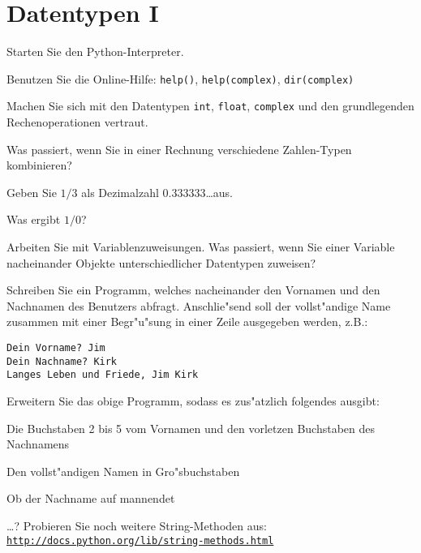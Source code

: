\section*{Datentypen I}

\begin{aufgabe}
Starten Sie den Python-Interpreter.
\begin{auflistung}
\item Benutzen Sie die Online-Hilfe: \lstinline{help()}, \lstinline{help(complex)}, \lstinline{dir(complex)}
\item Machen Sie sich mit den Datentypen \texttt{int}, \texttt{float}, \texttt{complex} und den grundlegenden Rechenoperationen vertraut.
\item Was passiert, wenn Sie in einer Rechnung verschiedene Zahlen-Typen kombinieren?
\item Geben Sie $1/3$ als Dezimalzahl $0.333333$\dots aus.
\item Was ergibt $1/0$?
\item Arbeiten Sie mit Variablenzuweisungen. Was passiert, wenn Sie einer Variable nacheinander Objekte unterschiedlicher Datentypen zuweisen?
\end{auflistung}
\end{aufgabe}

\begin{aufgabe}[Strings]
\begin{teilaufgabe}
Schreiben Sie ein Programm, welches nacheinander den Vornamen und den Nachnamen des Benutzers abfragt. Anschlie"send soll der vollst"andige Name zusammen mit einer Begr"u"sung in einer Zeile ausgegeben werden, z.B.:
\begin{lstlisting}
Dein Vorname? Jim
Dein Nachname? Kirk
Langes Leben und Friede, Jim Kirk
\end{lstlisting}
\end{teilaufgabe}
\begin{teilaufgabe}
Erweitern Sie das obige Programm, sodass es zus"atzlich folgendes ausgibt:
\begin{auflistung}
\item Die Buchstaben 2 bis 5 vom Vornamen und den vorletzen Buchstaben des Nachnamens
\item Den vollst"andigen Namen in Gro"sbuchstaben
\item Ob der Nachname auf \glqq mann\grqq  endet
\item \dots ? Probieren Sie noch weitere String-Methoden aus:\\ \texttt{\underline{http://docs.python.org/lib/string-methods.html}}
\end{auflistung}
\end{teilaufgabe}
\end{aufgabe}

